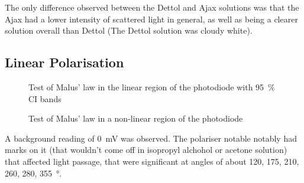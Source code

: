 \documentclass[a4paper]{scrartcl}
\begin{document}
The only difference observed between the Dettol and Ajax solutions was that the Ajax had a lower intensity of scattered light in general, as well as being a clearer solution overall than Dettol (The Dettol solution was cloudy white).

\subsection{Linear Polarisation}
\begin{figure}
    \centering
    \caption{Test of Malus' law in the linear region of the photodiode with \SI{95}{\percent} CI bands}
    \label{fig:3.3.A}
\end{figure}
\begin{figure}
    \centering
    \caption{Test of Malus' law in a non-linear region of the photodiode}
    \label{fig:3.3.B}
\end{figure}

A background reading of \SI{0}{\milli\volt} was observed. The polariser notable notably had marks on it (that wouldn't come off in isopropyl alchohol or acetone solution) that affected light passage, that were significant at angles of about 120, 175, 210, 260, 280, \SI{355}{\degree}.
\end{document}
